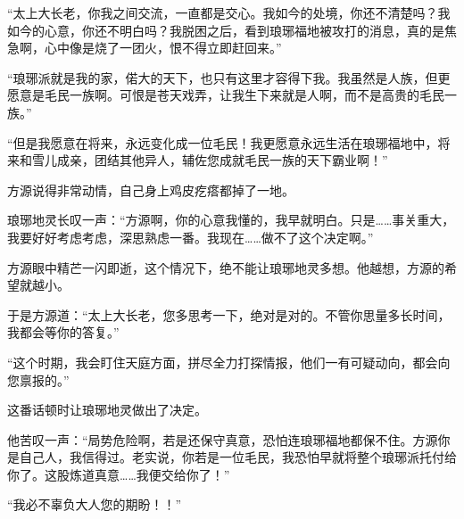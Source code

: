 \begin{this_body}
“太上大长老，你我之间交流，一直都是交心。我如今的处境，你还不清楚吗？我如今的心意，你还不明白吗？我脱困之后，看到琅琊福地被攻打的消息，真的是焦急啊，心中像是烧了一团火，恨不得立即赶回来。”

“琅琊派就是我的家，偌大的天下，也只有这里才容得下我。我虽然是人族，但更愿意是毛民一族啊。可恨是苍天戏弄，让我生下来就是人啊，而不是高贵的毛民一族。”

“但是我愿意在将来，永远变化成一位毛民！我更愿意永远生活在琅琊福地中，将来和雪儿成亲，团结其他异人，辅佐您成就毛民一族的天下霸业啊！”

方源说得非常动情，自己身上鸡皮疙瘩都掉了一地。

琅琊地灵长叹一声：“方源啊，你的心意我懂的，我早就明白。只是……事关重大，我要好好考虑考虑，深思熟虑一番。我现在……做不了这个决定啊。”

方源眼中精芒一闪即逝，这个情况下，绝不能让琅琊地灵多想。他越想，方源的希望就越小。

于是方源道：“太上大长老，您多思考一下，绝对是对的。不管你思量多长时间，我都会等你的答复。”

“这个时期，我会盯住天庭方面，拼尽全力打探情报，他们一有可疑动向，都会向您禀报的。”

这番话顿时让琅琊地灵做出了决定。

他苦叹一声：“局势危险啊，若是还保守真意，恐怕连琅琊福地都保不住。方源你是自己人，我信得过。老实说，你若是一位毛民，我恐怕早就将整个琅琊派托付给你了。这股炼道真意……我便交给你了！”

“我必不辜负大人您的期盼！！”

\end{this_body}

